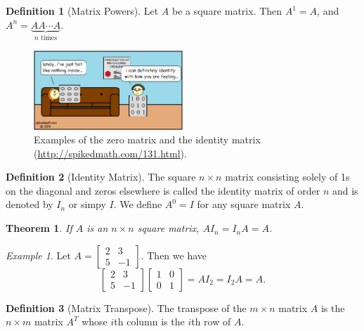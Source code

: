 \documentclass[10pt, a4paper]{amsart}
\newtheorem{thm}{Theorem}
\theoremstyle{definition}
\newtheorem{defn}{Definition}
\theoremstyle{remark}
\newtheorem{ex}{Example}
\begin{document}
\begin{defn}[Matrix Powers]
  Let $ A $ be a square matrix. Then $ A^1 = A $, and $ A^n = \underbrace{AA \cdots A}_{n \text{ times}} $.
\end{defn}

\begin{figure}
    \includegraphics[width=0.5\textwidth]{identitymatrix}
    \caption{Examples of the zero matrix and the identity matrix (\url{http://spikedmath.com/131.html}).}
    \label{fig:IdentityMatrix}
\end{figure}

\begin{defn}[Identity Matrix]
  The square $ n \times n $ matrix consisting solely of 1s on the diagonal and zeros elsewhere is
  called the identity matrix of order $ n $ and is denoted by $ I_n $ or simpy $ I $. We define
  $ A^0 = I $ for any square matrix $ A $.
\end{defn}

\begin{thm}
  If $ A $ is an $ n \times n $ square matrix, $ A I_n = I_n A = A $.
\end{thm}

\begin{ex}
  Let $ A = \begin{bmatrix} 2 & 3 \\ 5 & -1 \end{bmatrix} $. Then we have
  \begin{displaymath}
    \begin{bmatrix} 2 & 3 \\ 5 & -1 \end{bmatrix}\begin{bmatrix} 1 & 0 \\ 0 & 1 \end{bmatrix}= AI_2 = I_2A = A.
  \end{displaymath}
\end{ex}

\begin{defn}[Matrix Transpose]
  The transpose of the $ m \times n $ matrix $ A $ is the $ n \times m $ matrix $ A^T $ whose $ i$th column is the
  $ i$th row of $ A $.
\end{defn}
\end{document}
